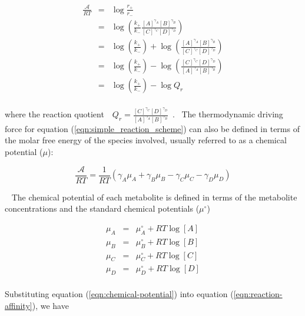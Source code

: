 \documentclass[10pt]{article}
\begin{document}
\begin{eqnarray}\label{eqn:reaction-affinity-mass-action-ratio}
\frac{\mathcal A}{RT} &=& \log\frac{r_+}{r_-} \\
& = & \log\left(\frac{k_+}{k_-}\frac{[A]^{\gamma_A}[B]^{\gamma_B}}{[C]^{\gamma_C}[D]^{\gamma_D}}\right) \\
& = & \log\left(\frac{k_+}{k_-}\right) + \log\left(\frac{[A]^{\gamma_A}[B]^{\gamma_B}}{[C]^{\gamma_C}[D]^{\gamma_D}}\right) \\
& = & \log\left(\frac{k_+}{k_-}\right) - \log\left(\frac{[C]^{\gamma_C}[D]^{\gamma_D}}{[A]^{\gamma_A}[B]^{\gamma_B}}\right) \\
& = & \log\left(\frac{k_+}{k_-}\right) - \log{Q_r} \\
\end{eqnarray}

where the reaction quotient~~\(\displaystyle Q_r = \frac{[C]^{\gamma_C}[D]^{\gamma_D}}{[A]^{\gamma_A}[B]^{\gamma_B}}\)~.~ The thermodynamic
driving force for equation
({\ref{eqn:simple_reaction_scheme}}) can also be
defined in terms of the molar free energy of the species involved,
usually referred to as a chemical potential (\(\mu\)):

\begin{equation}\label{eqn:reaction-affinity}
\frac{\mathcal{A}}{RT}=\frac{1}{RT}\left({{\gamma }_{A}}{{\mu }_{A}}+{{\gamma }_{B}}{{\mu }_{B}}-{{\gamma }_{C}}{{\mu }_{C}}-{{\gamma }_{D}}{{\mu }_{D}}\right)
\end{equation}

~ The chemical potential of each metabolite is defined in terms of the
metabolite concentrations and the standard chemical potentials
(\(\mu^\circ\))

\par\null

\begin{eqnarray}\label{eqn:chemical-potential}
\mu_A & = &\mu_A^\circ + RT\log [A] \\
\mu_B & = & \mu_B^\circ + RT\log [B] \\
\mu_C & =& \mu_C^\circ+ RT\log [C] \\
\mu_D & = &\mu_D^\circ + RT\log [D] \\
\end{eqnarray}

Substituting equation ({\ref{eqn:chemical-potential}})
into equation ({\ref{eqn:reaction-affinity}}), we have

~~
\end{document}
